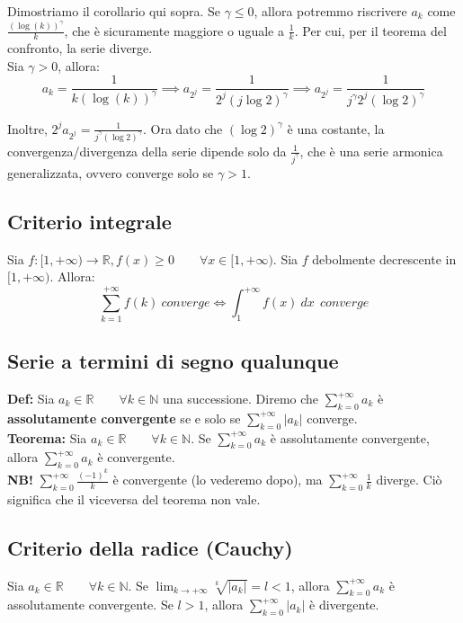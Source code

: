 \documentclass{article}
\begin{document}
\noindent Dimostriamo il corollario qui sopra. Se $\gamma \leq 0$, allora potremmo riscrivere $a_k$ come $\frac{(\log(k))^\gamma}{k}$, che è sicuramente maggiore o uguale a $\frac{1}{k}$. Per cui, per il teorema del confronto, la serie diverge.\\
Sia $\gamma > 0$, allora:
\begin{equation*}
    a_k = \frac{1}{k(\log(k))^\gamma} \implies a_{2^j} = \frac{1}{2^j(j\log2)^\gamma} \implies a_{2^j} = \frac{1}{j^\gamma2^j(\log2)^\gamma}
\end{equation*}

\noindent Inoltre, $2^j a_{2^j} = \frac{1}{j^\gamma(\log2)^\gamma}$. Ora dato che $(\log2)^\gamma$ è una costante, la convergenza/divergenza della serie dipende solo da $\frac{1}{j^\gamma}$, che è una serie armonica generalizzata, ovvero converge solo se $\gamma > 1$.

\subsection{Criterio integrale}
Sia $f: [1, +\infty) \xrightarrow{} \mathbb{R}, f(x) \geq 0 \qquad \forall x \in [1, +\infty)$. Sia $f$ debolmente decrescente in $[1, +\infty)$. Allora:
\begin{equation*}
    \sum_{k = 1}^{+\infty} f(k) \ converge \iff \int_1^{+\infty} f(x) \ dx \ \ converge
\end{equation*}

\subsection{Serie a termini di segno qualunque}
\textbf{Def:} Sia $a_k \in \mathbb{R} \qquad \forall k \in \mathbb{N}$ una successione. Diremo che $\sum_{k = 0}^{+\infty} a_k$ è \textbf{assolutamente convergente} se e solo se $\sum_{k = 0}^{+\infty} |a_k|$ converge.\\

\noindent\textbf{Teorema:} Sia $a_k \in \mathbb{R} \qquad \forall k \in \mathbb{N}$. Se $\sum_{k = 0}^{+\infty} a_k$ è assolutamente convergente, allora $\sum_{k = 0}^{+\infty} a_k$ è convergente.\\

\noindent\textbf{NB!} $\sum_{k = 0}^{+\infty} \frac{(-1)^k}{k}$ è convergente (lo vederemo dopo), ma $\sum_{k = 0}^{+\infty} \frac{1}{k}$ diverge. Ciò significa che il viceversa del teorema non vale.

\subsection{Criterio della radice (Cauchy)}
Sia $a_k \in \mathbb{R} \qquad \forall k \in \mathbb{N}$. Se $\lim_{k \to +\infty} \sqrt[k]{|a_k|} = l < 1$, allora $\sum_{k = 0}^{+\infty} a_k$ è assolutamente convergente. Se $l > 1$, allora $\sum_{k = 0}^{+\infty} |a_k|$ è divergente.\\
\end{document}
